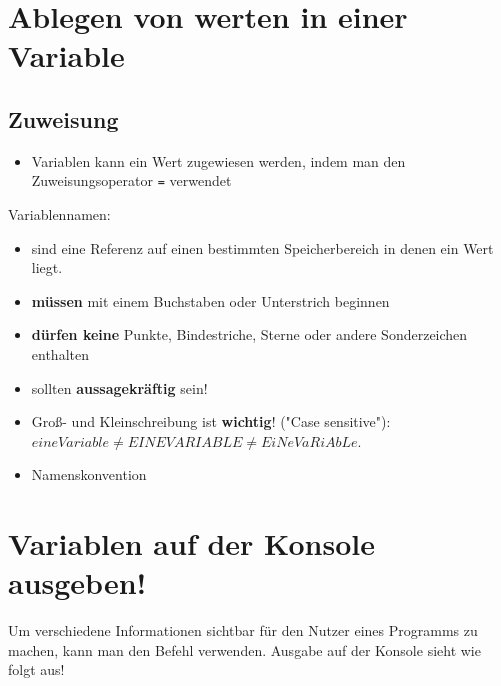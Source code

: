 \section{Ablegen von werten in einer Variable}
\subsection{Zuweisung}
\begin{frame}
    \slidehead
    \begin{itemize}[<+->]
        \item Variablen kann ein Wert zugewiesen werden, indem man den Zuweisungsoperator \lstinline{=} verwendet\\

    \end{itemize}
    \onslide<+->
\end{frame}

\begin{frame}
    \slidehead

    Variablennamen:
    \begin{itemize}[<+->]
        \item sind eine Referenz auf einen bestimmten Speicherbereich in denen ein Wert liegt.
        \item \textbf{müssen} mit einem Buchstaben oder Unterstrich beginnen
        \item \textbf{dürfen keine} Punkte, Bindestriche, Sterne oder andere Sonderzeichen enthalten
        \item sollten \textbf{aussagekräftig} sein!
        \item Groß- und Kleinschreibung ist \textbf{wichtig}! ("Case sensitive"):\\ $eineVariable \neq EINEVARIABLE \neq EiNeVaRiAbLe$.
        \item Namenskonvention 
    \end{itemize}
\end{frame}

\section{Variablen auf der Konsole ausgeben!}
\begin{frame}
    \slidehead
    Um verschiedene Informationen sichtbar für den Nutzer eines Programms zu machen, kann man den Befehl  verwenden.
    Ausgabe auf der Konsole sieht wie folgt aus!
\end{frame}

